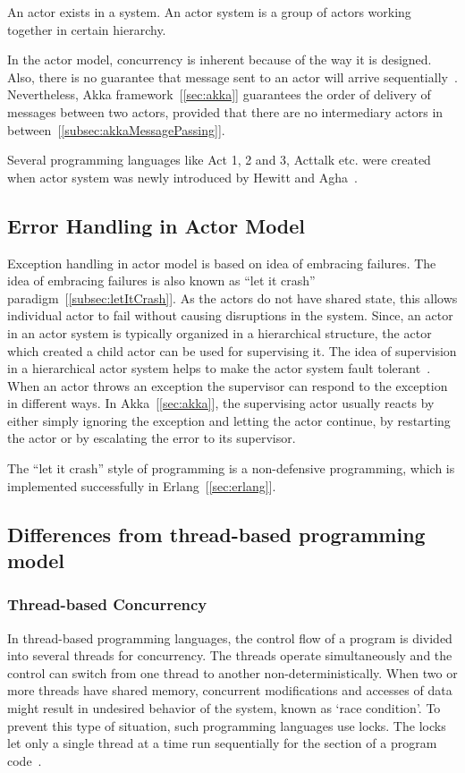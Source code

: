   An actor exists in a system. An actor system is a group of actors working together in certain hierarchy.

  In the actor model, concurrency is inherent because of the way it is designed. Also, there is no guarantee that message sent to an actor will arrive sequentially~\cite{hewittVideo}. Nevertheless, Akka framework~[\autoref{sec:akka}] guarantees the order of delivery of messages between two actors, provided that there are no intermediary actors in between~[\autoref{subsec:akkaMessagePassing}].

  Several programming languages like Act 1, 2 and 3, Acttalk etc. were created when actor system was newly introduced by Hewitt and Agha~\cite{agha, hewitt}.

\subsection{Error Handling in Actor Model}
Exception handling in actor model is based on idea of embracing failures. The idea of embracing failures is also known as “let it crash” paradigm~[\autoref{subsec:letItCrash}]. As the actors do not have shared state, this allows individual actor to fail without causing disruptions in the system. Since, an actor in an actor system is typically organized in a hierarchical structure, the actor which created a child actor can be used for supervising it. The idea of supervision in a hierarchical actor system helps to make the actor system fault tolerant~\cite{Erb2012}. When an actor throws an exception the supervisor can respond to the exception in different ways. In Akka~[\autoref{sec:akka}], the supervising actor usually reacts by either simply ignoring the exception and letting the actor continue, by restarting the actor or by escalating the error to its supervisor.

  The “let it crash” style of programming is a non-defensive programming, which is implemented successfully in Erlang~[\autoref{sec:erlang}].

\subsection{Differences from thread-based programming model}
\subsubsection{Thread-based Concurrency}
  \label{subsec:thread}
  In thread-based programming languages, the control flow of a program is divided into several threads for concurrency. The threads operate simultaneously and the control can switch from one thread to another non-deterministically. When two or more threads have shared memory, concurrent modifications and accesses of data might result in undesired behavior of the system, known as ‘race condition’. To prevent this type of situation, such programming languages use locks. The locks let only a single thread at a time run sequentially for the section of a program code~\cite{ambientTalk}.

